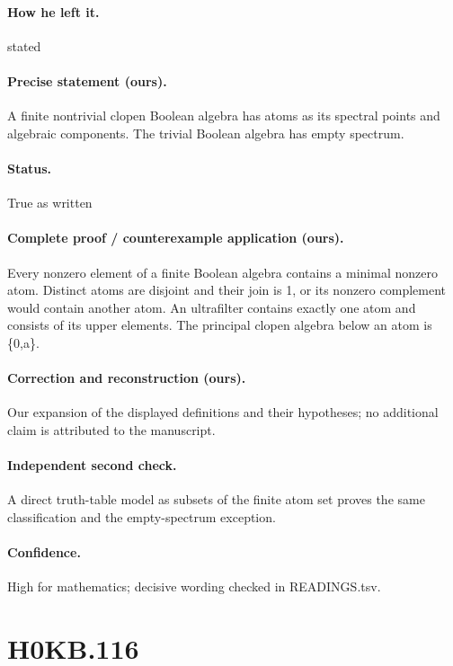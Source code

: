 \paragraph{How he left it.} stated

\paragraph{Precise statement (ours).} A finite nontrivial clopen Boolean algebra has atoms as its spectral points and algebraic components. The trivial Boolean algebra has empty spectrum.

\paragraph{Status.} True as written

\paragraph{Complete proof / counterexample application (ours).} Every nonzero element of a finite Boolean algebra contains a minimal nonzero atom. Distinct atoms are disjoint and their join is 1, or its nonzero complement would contain another atom. An ultrafilter contains exactly one atom and consists of its upper elements. The principal clopen algebra below an atom is \{0,a\}.

\paragraph{Correction and reconstruction (ours).} Our expansion of the displayed definitions and their hypotheses; no additional claim is attributed to the manuscript.

\paragraph{Independent second check.} A direct truth-table model as subsets of the finite atom set proves the same classification and the empty-spectrum exception.

\paragraph{Confidence.} High for mathematics; decisive wording checked in READINGS.tsv.

\section*{H0KB.116}\label{statement:H0KB.116}
